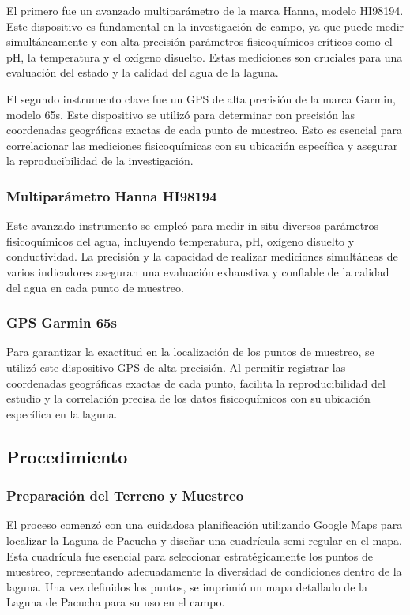 El primero fue un avanzado multiparámetro de la marca Hanna, modelo HI98194. Este dispositivo es fundamental en la investigación de campo, ya que puede medir simultáneamente y con alta precisión parámetros fisicoquímicos críticos como el pH, la temperatura y el oxígeno disuelto. Estas mediciones son cruciales para una evaluación  del estado y la calidad del agua de la laguna.

El segundo instrumento clave fue un GPS de alta precisión de la marca Garmin, modelo 65s. Este dispositivo se utilizó para determinar con precisión las coordenadas geográficas exactas de cada punto de muestreo. Esto es esencial para correlacionar las mediciones fisicoquímicas con su ubicación específica y asegurar la reproducibilidad de la investigación.

\subsubsection{Multiparámetro Hanna HI98194}
Este avanzado instrumento se empleó para medir in situ diversos parámetros fisicoquímicos del agua, incluyendo temperatura, pH, oxígeno disuelto y conductividad. La precisión y la capacidad de realizar mediciones simultáneas de varios indicadores aseguran una evaluación exhaustiva y confiable de la calidad del agua en cada punto de muestreo.

\subsubsection{GPS Garmin 65s}
Para garantizar la exactitud en la localización de los puntos de muestreo, se utilizó este dispositivo GPS de alta precisión. Al permitir registrar las coordenadas geográficas exactas de cada punto, facilita la reproducibilidad del estudio y la correlación precisa de los datos fisicoquímicos con su ubicación específica en la laguna.

\subsection{Procedimiento}

\subsubsection{Preparación del Terreno y Muestreo}
El proceso comenzó con una cuidadosa planificación utilizando Google Maps para localizar la Laguna de Pacucha y diseñar una cuadrícula semi-regular en el mapa. Esta cuadrícula fue esencial para seleccionar estratégicamente los puntos de muestreo, representando adecuadamente la diversidad de condiciones dentro de la laguna. Una vez definidos los puntos, se imprimió un mapa detallado de la Laguna de Pacucha para su uso en el campo.



